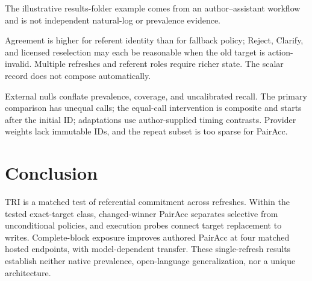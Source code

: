 \documentclass[letterpaper]{article}
\begin{document}
The illustrative results-folder example comes from an author--assistant workflow and is not
independent natural-log or prevalence evidence.

Agreement is higher for referent identity than for fallback policy; Reject, Clarify, and
licensed reselection may each be reasonable when the old target is action-invalid. Multiple
refreshes and referent roles require richer state. The scalar record does not compose automatically.

External nulls conflate prevalence, coverage, and uncalibrated recall. The primary comparison has
unequal calls; the equal-call intervention is composite and starts after the initial ID; adaptations
use author-supplied timing contrasts. Provider weights lack immutable IDs, and the repeat subset is
too sparse for PairAcc.

\section{Conclusion}

TRI is a matched test of referential commitment across refreshes. Within the tested exact-target
class, changed-winner PairAcc separates selective from unconditional policies, and execution probes
connect target replacement to writes. Complete-block exposure improves authored PairAcc at four
matched hosted endpoints, with model-dependent transfer. These single-refresh results establish
neither native prevalence, open-language generalization, nor a unique architecture.

\clearpage
{\small

}
\end{document}
